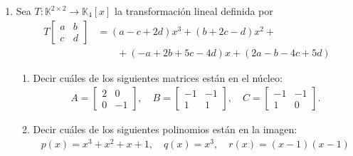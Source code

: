 \begin{enumerate}[topsep=6pt, itemsep=.4cm]
        \item Sea $T:\mathbb{K}^{2\times 2}\longrightarrow\mathbb{K}_{4}[x]$ la transformación lineal definida por
        \begin{align*}
        T   \begin{bmatrix}  a&b\\c&d \end{bmatrix} &= (a-c+2d)x^3+(b+2c-d)x^2+ \\
        &\qquad+(-a+2b+5c-4d)x+(2a-b-4c+5d)
        \end{align*}
        \begin{enumerate}
            \item\label{tl-matrices-pol-a} Decir cuáles de los siguientes matrices están en el núcleo:
                \begin{align*}
                    A=\begin{bmatrix}
                        2&0\\0&-1
                    \end{bmatrix},
                \quad
                B=\begin{bmatrix}
                    -1&-1\\1&1
                \end{bmatrix},
                \quad
                C=\begin{bmatrix}
                    -1&-1\\1&0
                \end{bmatrix}.
                \end{align*}
            \item\label{tl-matrices-pol-b} Decir cuáles de los siguientes polinomios están en la imagen:
                \begin{align*}
                    p(x)=x^3+x^2+x+1,\quad q(x)=x^3, \quad r(x)=(x-1)(x-1) 
                \end{align*}
        \end{enumerate}
    
    \rta 


\end{enumerate}
